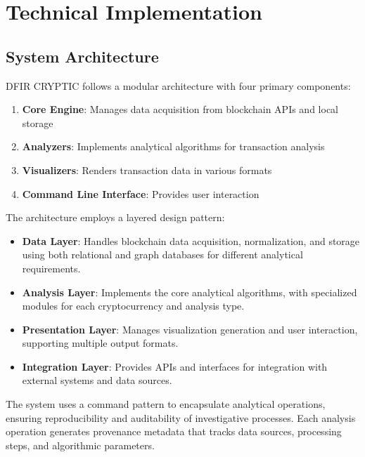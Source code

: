 \documentclass[conference]{IEEEtran}
\begin{document}
\section{Technical Implementation}

\subsection{System Architecture}

DFIR CRYPTIC follows a modular architecture with four primary components:

\begin{enumerate}
    \item \textbf{Core Engine}: Manages data acquisition from blockchain APIs and local storage
    \item \textbf{Analyzers}: Implements analytical algorithms for transaction analysis
    \item \textbf{Visualizers}: Renders transaction data in various formats
    \item \textbf{Command Line Interface}: Provides user interaction
\end{enumerate}

The architecture employs a layered design pattern:

\begin{itemize}
    \item \textbf{Data Layer}: Handles blockchain data acquisition, normalization, and storage using both relational and graph databases for different analytical requirements.
    
    \item \textbf{Analysis Layer}: Implements the core analytical algorithms, with specialized modules for each cryptocurrency and analysis type.
    
    \item \textbf{Presentation Layer}: Manages visualization generation and user interaction, supporting multiple output formats.
    
    \item \textbf{Integration Layer}: Provides APIs and interfaces for integration with external systems and data sources.
\end{itemize}

The system uses a command pattern to encapsulate analytical operations, ensuring reproducibility and auditability of investigative processes. Each analysis operation generates provenance metadata that tracks data sources, processing steps, and algorithmic parameters.
\end{document}
